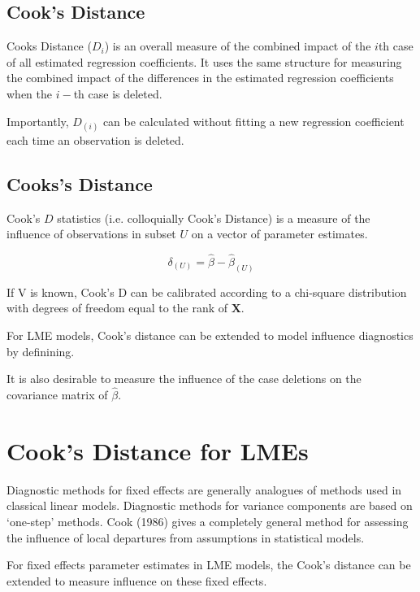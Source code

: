\documentclass[12pt, a4paper]{article}
\begin{document}
\subsection*{Cook's Distance}%
Cooks Distance ($D_{i}$) is an overall measure of the combined impact of the $i$th case of all estimated regression coefficients. It uses the same structure for measuring the combined impact of the differences in the estimated regression coefficients when the $i-$th case is deleted.

Importantly, $D_{(i)}$ can be calculated without fitting a new regression coefficient each time an observation is deleted.



\subsection{Cooks's Distance}%
 Cook's $D$ statistics (i.e. colloquially Cook's Distance) is a measure of the influence of observations in subset $U$ on a vector of parameter estimates.

\[ \delta_{(U)} = \hat{\beta} - \hat{\beta}_{(U)}\]

If V is known, Cook's D can be calibrated according to a chi-square distribution with degrees of freedom equal to the rank of $\boldsymbol{X}$.




For LME models, Cook's distance can be extended to model influence diagnostics by definining.


It is also desirable to measure the influence of the case deletions on the covariance matrix of $\hat{\beta}$.

\section{Cook's Distance for LMEs} %
Diagnostic methods for fixed effects are generally analogues of methods used in classical linear models.
Diagnostic methods for variance components are based on `one-step' methods. Cook (1986) gives a completely general method for assessing the influence of local departures from assumptions in statistical models.

For fixed effects parameter estimates in LME models, the  Cook's distance can be extended to measure influence on these fixed effects.
\end{document}
